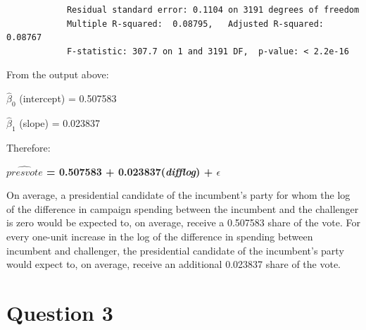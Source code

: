 \documentclass[12pt,letterpaper]{article}
\begin{document}
\begin{enumerate}
\begin{verbatim}
			Residual standard error: 0.1104 on 3191 degrees of freedom
			Multiple R-squared:  0.08795,	Adjusted R-squared:  0.08767 
			F-statistic: 307.7 on 1 and 3191 DF,  p-value: < 2.2e-16
		\end{verbatim}
		
			From the output above:
		
		$\hat{\beta}_0$ (intercept) = 0.507583
		
		$\hat{\beta}_1$ (slope) = 0.023837
		
		\vspace{.5cm} Therefore:
		
		\textbf{		$\hat{presvote}$ = 0.507583 + 0.023837(\textit{difflog}) + $\epsilon$}
		
		On average, a presidential candidate of the incumbent's party for whom the log of the difference in campaign spending between the incumbent and the challenger is zero would be expected to, on average, receive a 0.507583 share of the vote. For every one-unit increase in the log of the difference in spending between incumbent and challenger, the presidential candidate of the incumbent's party would expect to, on average, receive an additional 0.023837 share of the vote. \vspace{0.5cm}
		
	\end{enumerate}
	
	\newpage	
\section*{Question 3}
\end{document}

